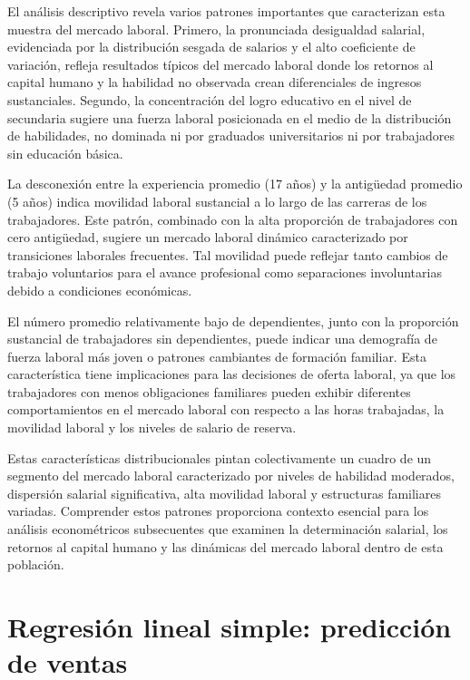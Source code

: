 \documentclass[12pt]{article}
\begin{document}
El análisis descriptivo revela varios patrones importantes que caracterizan esta muestra del mercado laboral. Primero, la pronunciada desigualdad salarial, evidenciada por la distribución sesgada de salarios y el alto coeficiente de variación, refleja resultados típicos del mercado laboral donde los retornos al capital humano y la habilidad no observada crean diferenciales de ingresos sustanciales. Segundo, la concentración del logro educativo en el nivel de secundaria sugiere una fuerza laboral posicionada en el medio de la distribución de habilidades, no dominada ni por graduados universitarios ni por trabajadores sin educación básica.

La desconexión entre la experiencia promedio (17 años) y la antigüedad promedio (5 años) indica movilidad laboral sustancial a lo largo de las carreras de los trabajadores. Este patrón, combinado con la alta proporción de trabajadores con cero antigüedad, sugiere un mercado laboral dinámico caracterizado por transiciones laborales frecuentes. Tal movilidad puede reflejar tanto cambios de trabajo voluntarios para el avance profesional como separaciones involuntarias debido a condiciones económicas.

El número promedio relativamente bajo de dependientes, junto con la proporción sustancial de trabajadores sin dependientes, puede indicar una demografía de fuerza laboral más joven o patrones cambiantes de formación familiar. Esta característica tiene implicaciones para las decisiones de oferta laboral, ya que los trabajadores con menos obligaciones familiares pueden exhibir diferentes comportamientos en el mercado laboral con respecto a las horas trabajadas, la movilidad laboral y los niveles de salario de reserva.

Estas características distribucionales pintan colectivamente un cuadro de un segmento del mercado laboral caracterizado por niveles de habilidad moderados, dispersión salarial significativa, alta movilidad laboral y estructuras familiares variadas. Comprender estos patrones proporciona contexto esencial para los análisis econométricos subsecuentes que examinen la determinación salarial, los retornos al capital humano y las dinámicas del mercado laboral dentro de esta población.



\section{Regresión lineal simple: predicción de ventas}
\end{document}
